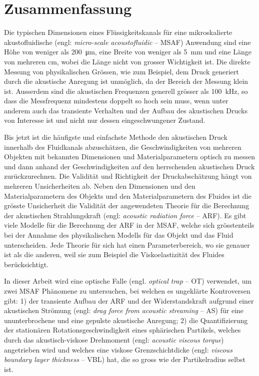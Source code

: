 \chapter*{Zusammenfassung}



Die typischen Dimensionen eines Flüssigkeitskanals für eine mikroskalierte 
akustofluidische (engl: \emph{micro-scale acoustofluidic} -- MSAF) Anwendung 
sind eine Höhe von weniger als \SI{200}{\um}, eine Breite von weniger als 
\SI{5}{\mm} und eine Länge von mehreren \si{\cm}, wobei die Länge nicht von 
grosser Wichtigkeit ist.  Die direkte Messung von physikalischen Grössen, wie 
zum Beispiel, dem Druck generiert durch die akustische Anregung ist unmöglich, 
da der Bereich der Messung klein ist.  Ausserdem sind die akustischen 
Frequenzen generell grösser als \SI{100}{\kilo\hertz}, so dass die Messfrequenz 
mindestens doppelt so hoch sein muss, wenn unter anderem auch das transiente 
Verhalten und der Aufbau des akustischen Drucks von Interesse ist und nicht nur 
dessen eingeschwungener Zustand.

Bis jetzt ist die häufigste und einfachste Methode den akustischen Druck 
innerhalb des Fluidkanals abzuschätzen, die Geschwindigkeiten von mehreren 
Objekten mit bekannten Dimensionen und Materialparametern optisch zu messen und 
dann anhand der Geschwindigkeiten auf den herrschenden akustischen Druck 
zurückzurechnen. Die Validität und Richtigkeit der Druckabschätzung hängt von 
mehreren Unsicherheiten ab. Neben den Dimensionen und den Materialparametern 
des Objekts und den Materialparametern des Fluides ist die grösste Unsicherheit 
die Validität der angewendeten Theorie für die Berechnung der akustischen 
Strahlungskraft (engl: \emph{acoustic radiation force} -- ARF). Es gibt viele 
Modelle für die Berechnung der ARF in der MSAF, welche sich grösstenteils bei 
der Annahme des physikalischen Modells für das Objekt und das Fluid 
unterscheiden. Jede Theorie für sich hat einen Parameterbereich, wo sie genauer 
ist als die anderen, weil sie zum Beispiel die Viskoelastizität des Fluides 
berücksichtigt.

In dieser Arbeit wird eine optische Falle (engl. \emph{optical trap} -- OT) 
verwendet, um zwei MSAF Phänomene zu untersuchen, bei welchen es ungeklärte 
Kontroversen gibt: 1) der transiente Aufbau der ARF und der Widerstandskraft 
aufgrund einer akustischen Strömung (engl: \emph{drag force from acoustic 
  streaming} -- AS) für eine ununterbrochene und eine gepulste akustische 
Anregung; 2) die Quantifizierung der stationären Rotationsgeschwindigkeit eines 
sphärischen Partikels, welches durch das akustisch-viskose Drehmoment (engl: 
\emph{acoustic viscous torque}) angetrieben wird und welches eine viskose 
Grenzschichtdicke (engl: \emph{viscous boundary layer thickness} -- VBL) hat, 
die so gross wie der Partikelradius selbst ist.


